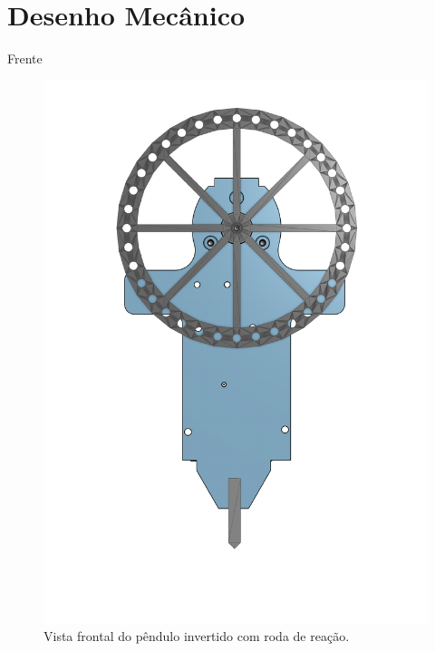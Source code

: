 \section{Desenho Mecânico}

\begin{frame}{Frente}
    \begin{figure}
        \centering
        \includegraphics[height=0.8\textheight]{frente.pdf}
        \caption{Vista frontal do pêndulo invertido com roda de reação.}
        \label{fig:frente}
    \end{figure}
\end{frame}

